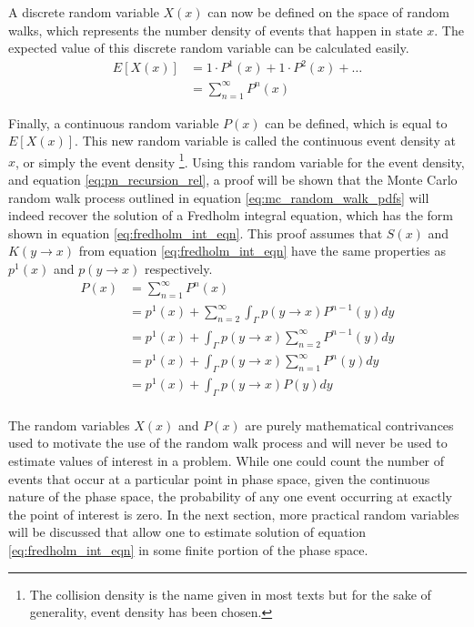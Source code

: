 A discrete random variable $X(x)$ can now be defined on the space of random 
walks, which represents the number density of events that happen in state $x$. 
The expected value of this discrete random variable can be calculated easily.
\begin{align}
  E[X(x)] & = 1 \cdot P^1(x) + 1 \cdot P^2(x) + \ldots \nonumber \\
  & = \sum_{n=1}^{\infty} P^n(x)
  \label{eq:expec_coll_dens}
\end{align}

Finally, a continuous random variable $P(x)$ can be defined, which is equal to
$E[X(x)]$. This new random variable is called the continuous event density 
at $x$, or simply the event density
\footnote{The collision density is the name given in most texts but for the
sake of generality, event density has been chosen.}. Using this random variable 
for the event density, and equation \ref{eq:pn_recursion_rel}, a proof will be 
shown that the Monte Carlo random walk process outlined in equation 
\ref{eq:mc_random_walk_pdfs} will indeed recover the solution of a Fredholm 
integral equation, which has the form shown in equation 
\ref{eq:fredholm_int_eqn}. This proof assumes that $S(x)$ and $K(y \to x)$ from 
equation \ref{eq:fredholm_int_eqn} have the same properties as $p^1(x)$ and 
$p(y \to x)$ respectively. 
\begin{align}
  P(x) & = \sum_{n=1}^{\infty} P^n(x) \nonumber \\
  & = p^1(x) + \sum_{n=2}^{\infty} \int_{\Gamma} p(y \to x) P^{n-1}(y)dy \nonumber\\
  & = p^1(x) + \int_{\Gamma} p(y \to x) \sum_{n=2}^{\infty} P^{n-1}(y)dy \nonumber\\
  & = p^1(x) + \int_{\Gamma} p(y \to x) \sum_{n=1}^{\infty} P^{n}(y)dy \nonumber\\
  & = p^1(x) + \int_{\Gamma} p(y \to x) P(y)dy \nonumber \\
\end{align}

The random variables $X(x)$ and $P(x)$ are purely mathematical contrivances
used to motivate the use of the random walk process and will never be used 
to estimate values of interest in a problem. While one could count the
number of events that occur at a particular point in phase space, given the 
continuous nature of the phase space, the probability of any one event 
occurring at exactly the point of interest is zero. In the next section, more 
practical random variables will be discussed that allow one to estimate 
solution of equation \ref{eq:fredholm_int_eqn} in some finite portion of the 
phase space.

